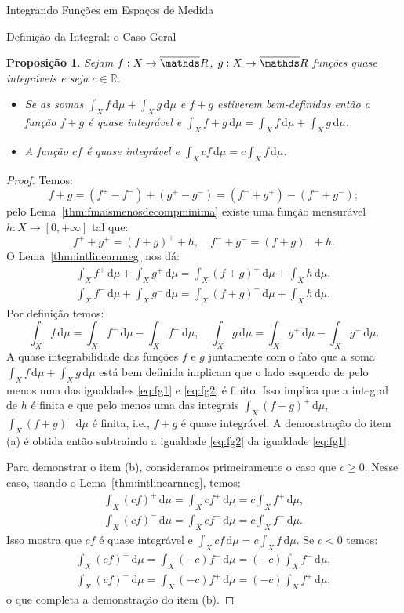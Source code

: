 \documentclass[oneside,final,11pt]{amsbook}
\newcommand{\R}{\mathds R}
\newcommand{\dd}{\mathrm d}
\theoremstyle{remark}\newtheorem{exercise}{Exercício}[chapter]
\theoremstyle{remark}\newtheorem{*exercise}[exercise]{\hbox to 0pt{\hskip 0pt minus 1fil*}Exercício}
\theoremstyle{definition}\newtheorem{exdefin}{Definição}[chapter]
\theoremstyle{plain}\newtheorem{teo}{Teorema}[section]
\theoremstyle{plain}\newtheorem{lem}[teo]{Lema}
\theoremstyle{plain}\newtheorem{prop}[teo]{Proposição}
\theoremstyle{plain}\newtheorem{cor}[teo]{Corolário}
\theoremstyle{definition}\newtheorem{defin}[teo]{Definição}
\theoremstyle{remark}\newtheorem{rem}[teo]{Observação}
\theoremstyle{definition}\newtheorem{notation}[teo]{Notação}
\theoremstyle{definition}\newtheorem{convention}[teo]{Convenção}
\theoremstyle{definition}\newtheorem{example}[teo]{Exemplo}
\numberwithin{section}{chapter}
\numberwithin{equation}{section}
\begin{document}
\begin{chapter}{Integrando Funções em Espaços de Medida}
\begin{section}{Definição da Integral: o Caso Geral}
\begin{prop}\label{thm:propintlinear}
Sejam $f:X\to\overline\R$, $g:X\to\overline\R$ funções quase integráveis e seja $c\in\R$.
\begin{itemize}
\item[(a)] Se as somas $\int_Xf\,\dd\mu+\int_Xg\,\dd\mu$ e $f+g$ estiverem bem-definidas então
a função $f+g$ é quase integrável e $\int_Xf+g\,\dd\mu=\int_Xf\,\dd\mu+\int_Xg\,\dd\mu$.
\item[(b)] A função $cf$ é quase integrável e $\int_Xcf\,\dd\mu=c\int_Xf\,\dd\mu$.
\end{itemize}
\end{prop}
\begin{proof}
Temos:
\[f+g=(f^+-f^-)+(g^+-g^-)=(f^++g^+)-(f^-+g^-);\]
pelo Lema~\ref{thm:fmaismenosdecompminima} existe uma função mensurável $h:X\to[0,+\infty]$
tal que:
\[f^++g^+=(f+g)^++h,\quad f^-+g^-=(f+g)^-+h.\]
O Lema~\ref{thm:intlinearnneg} nos dá:
\begin{gather}
\label{eq:fg1}\int_Xf^+\,\dd\mu+\int_Xg^+\,\dd\mu=\int_X(f+g)^+\,\dd\mu+\int_Xh\,\dd\mu,\\
\label{eq:fg2}\int_Xf^-\,\dd\mu+\int_Xg^-\,\dd\mu=\int_X(f+g)^-\,\dd\mu+\int_Xh\,\dd\mu.
\end{gather}
Por definição temos:
\[\int_Xf\,\dd\mu=\int_Xf^+\,\dd\mu-\int_Xf^-\,\dd\mu,\quad
\int_Xg\,\dd\mu=\int_Xg^+\,\dd\mu-\int_Xg^-\,\dd\mu.\]
A quase integrabilidade das funções $f$ e $g$ juntamente com o fato que a soma
$\int_Xf\,\dd\mu+\int_Xg\,\dd\mu$ está bem definida
implicam que o lado esquerdo de pelo menos uma das igualdades \eqref{eq:fg1} e \eqref{eq:fg2}
é finito. Isso implica que a integral de $h$ é finita e que pelo menos uma das integrais
$\int_X(f+g)^+\,\dd\mu$, $\int_X(f+g)^-\,\dd\mu$ é finita, i.e., $f+g$ é quase integrável.
A demonstração do item (a) é obtida então subtraindo a igualdade \eqref{eq:fg2} da igualdade \eqref{eq:fg1}.

Para demonstrar o item (b), consideramos primeiramente o caso que $c\ge0$. Nesse caso,
usando o Lema~\ref{thm:intlinearnneg}, temos:
\begin{gather*}
\int_X(cf)^+\,\dd\mu=\int_Xcf^+\,\dd\mu=c\int_Xf^+\,\dd\mu,\\
\int_X(cf)^-\,\dd\mu=\int_Xcf^-\,\dd\mu=c\int_Xf^-\,\dd\mu.
\end{gather*}
Isso mostra que $cf$ é quase integrável e $\int_Xcf\,\dd\mu=c\int_Xf\,\dd\mu$. Se $c<0$ temos:
\begin{gather*}
\int_X(cf)^+\,\dd\mu=\int_X(-c)f^-\,\dd\mu=(-c)\int_Xf^-\,\dd\mu,\\
\int_X(cf)^-\,\dd\mu=\int_X(-c)f^+\,\dd\mu=(-c)\int_Xf^+\,\dd\mu,
\end{gather*}
o que completa a demonstração do item (b).
\end{proof}


\end{section}
\end{chapter}
\end{document}

